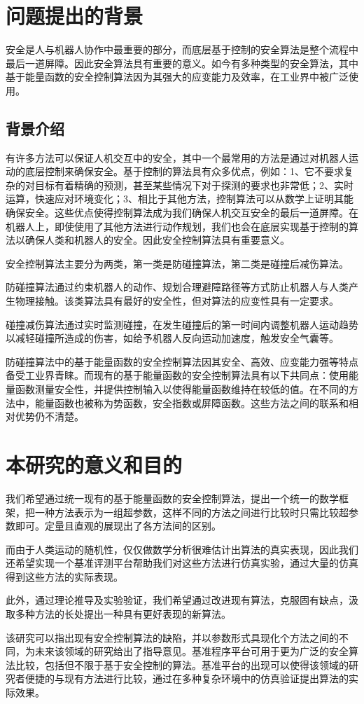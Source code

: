 \section{问题提出的背景}

安全是人与机器人协作中最重要的部分，而底层基于控制的安全算法是整个流程中最后一道屏障。因此安全算法具有重要的意义。如今有多种类型的安全算法，其中基于能量函数的安全控制算法因为其强大的应变能力及效率，在工业界中被广泛使用。

\subsection{背景介绍}

有许多方法可以保证人机交互中的安全，其中一个最常用的方法是通过对机器人运动的底层控制来确保安全。基于控制的算法具有众多优点，例如：1、它不要求复杂的对目标有着精确的预测，甚至某些情况下对于探测的要求也非常低；2、实时运算，快速应对环境变化；3、相比于其他方法，控制算法可以从数学上证明其能确保安全。这些优点使得控制算法成为我们确保人机交互安全的最后一道屏障。在机器人上，即使使用了其他方法进行动作规划，我们也会在底层实现基于控制的算法以确保人类和机器人的安全。因此安全控制算法具有重要意义。

安全控制算法主要分为两类，第一类是防碰撞算法，第二类是碰撞后减伤算法。

防碰撞算法通过约束机器人的动作、规划合理避障路径等方式防止机器人与人类产生物理接触。该类算法具有最好的安全性，但对算法的应变性具有一定要求。

碰撞减伤算法通过实时监测碰撞，在发生碰撞后的第一时间内调整机器人运动趋势以减轻碰撞所造成的伤害，如给予机器人反向运动加速度，触发安全气囊等。

防碰撞算法中的基于能量函数的安全控制算法因其安全、高效、应变能力强等特点备受工业界青睐。而现有的基于能量函数的安全控制算法具有以下共同点：使用能量函数测量安全性，并提供控制输入以使得能量函数维持在较低的值。在不同的方法中，能量函数也被称为势函数，安全指数或屏障函数。这些方法之间的联系和相对优势仍不清楚。

\section{本研究的意义和目的}

我们希望通过统一现有的基于能量函数的安全控制算法，提出一个统一的数学框架，把一种方法表示为一组超参数，这样不同的方法之间进行比较时只需比较超参数即可。定量且直观的展现出了各方法间的区别。

而由于人类运动的随机性，仅仅做数学分析很难估计出算法的真实表现，因此我们还希望实现一个基准评测平台帮助我们对这些方法进行仿真实验，通过大量的仿真得到这些方法的实际表现。

此外，通过理论推导及实验验证，我们希望通过改进现有算法，克服固有缺点，汲取多种方法的长处提出一种具有更好表现的新算法。

该研究可以指出现有安全控制算法的缺陷，并以参数形式具现化个方法之间的不同，为未来该领域的研究给出了指导意见。基准程序平台可用于更为广泛的安全算法比较，包括但不限于基于安全控制的算法。基准平台的出现可以使得该领域的研究者便捷的与现有方法进行比较，通过在多种复杂环境中的仿真验证提出算法的实际效果。